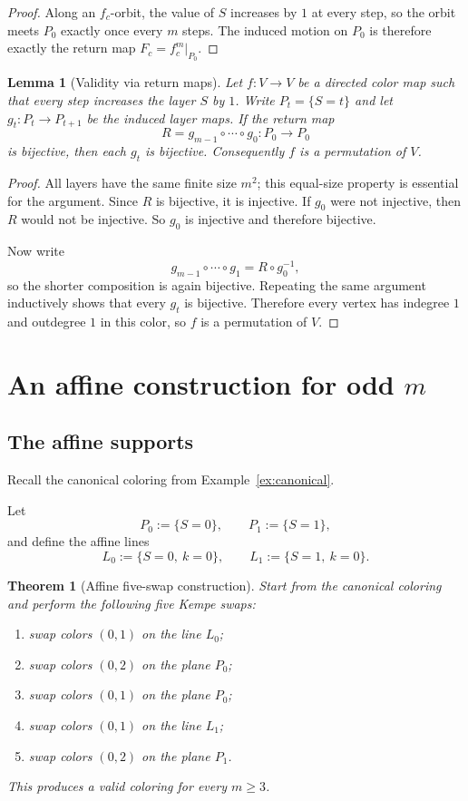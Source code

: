 \documentclass[11pt]{article}
\newtheorem{theorem}{Theorem}
\newtheorem{lemma}{Lemma}
\begin{document}
\begin{proof}
Along an $f_c$-orbit, the value of $S$ increases by $1$ at every step, so the orbit meets $P_0$ exactly once every $m$ steps.
The induced motion on $P_0$ is therefore exactly the return map $F_c=f_c^m|_{P_0}$.
\end{proof}


\begin{lemma}[Validity via return maps]\label{lem:return-validity}
Let $f:V\to V$ be a directed color map such that every step increases the layer $S$ by $1$.
Write $P_t=\{S=t\}$ and let $g_t:P_t\to P_{t+1}$ be the induced layer maps.
If the return map
\[
R=g_{m-1}\circ\cdots\circ g_0:P_0\to P_0
\]
is bijective, then each $g_t$ is bijective.
Consequently $f$ is a permutation of $V$.
\end{lemma}

\begin{proof}
All layers have the same finite size $m^2$; this equal-size property is essential for the argument.
Since $R$ is bijective, it is injective.
If $g_0$ were not injective, then $R$ would not be injective.
So $g_0$ is injective and therefore bijective.

Now write
\[
g_{m-1}\circ\cdots\circ g_1 = R\circ g_0^{-1},
\]
so the shorter composition is again bijective.
Repeating the same argument inductively shows that every $g_t$ is bijective.
Therefore every vertex has indegree $1$ and outdegree $1$ in this color, so $f$ is a permutation of $V$.
\end{proof}


\section{An affine construction for odd $m$}\label{sec:affine}

\subsection{The affine supports}
Recall the canonical coloring from Example~\ref{ex:canonical}.

Let
\[
P_0:=\{S=0\},\qquad P_1:=\{S=1\},
\]
and define the affine lines
\[
L_0:=\{S=0,\ k=0\},\qquad L_1:=\{S=1,\ k=0\}.
\]

\begin{theorem}[Affine five-swap construction]\label{thm:5swap}
Start from the canonical coloring and perform the following five Kempe swaps:
\begin{enumerate}[leftmargin=2.2em]
\item swap colors $(0,1)$ on the line $L_0$;
\item swap colors $(0,2)$ on the plane $P_0$;
\item swap colors $(0,1)$ on the plane $P_0$;
\item swap colors $(0,1)$ on the line $L_1$;
\item swap colors $(0,2)$ on the plane $P_1$.
\end{enumerate}
This produces a valid coloring for every $m\ge 3$.
\end{theorem}
\end{document}
